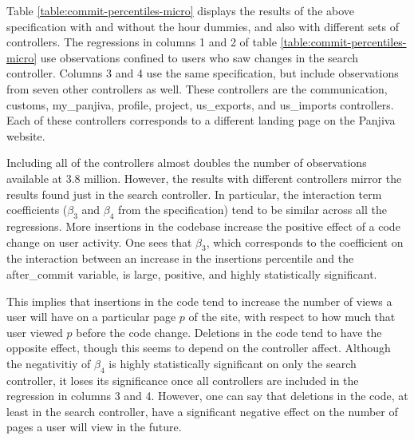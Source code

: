 \documentclass[12pt]{article}
\begin{document}
Table \ref{table:commit-percentiles-micro} displays the results of the above specification with and without the hour dummies, and also with different sets of controllers. The regressions in columns 1 and 2 of table \ref{table:commit-percentiles-micro} use observations confined to users who saw changes in the search controller. Columns 3 and 4 use the same specification, but include observations from seven other controllers as well. These controllers are the communication, customs, my\_panjiva, profile, project, us\_exports, and us\_imports controllers. Each of these controllers corresponds to a different landing page on the Panjiva website.

Including all of the controllers almost doubles the number of observations available at 3.8 million. However, the results with different controllers mirror the results found just in the search controller. In particular, the interaction term coefficients ($\beta_3$ and $\beta_4$ from the specification) tend to be similar across all the regressions. More insertions in the codebase increase the positive effect of a code change on user activity. One sees that $\beta_3$, which corresponds to the coefficient on the interaction between an increase in the insertions percentile and the after\_commit variable, is large, positive, and highly statistically significant. 

This implies that insertions in the code tend to increase the number of views a user will have on a particular page $p$ of the site, with respect to how much that user viewed $p$ before the code change. Deletions in the code tend to have the opposite effect, though this seems to depend on the controller affect. Although the negativitiy of $\beta_4$ is highly statistically significant on only the search controller, it loses its significance once all controllers are included in the regression in columns 3 and 4. However, one can say that deletions in the code, at least in the search controller, have a significant negative effect on the number of pages a user will view in the future.
\end{document}
